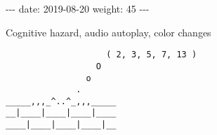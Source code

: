-\/-\/- date: 2019-08-20 weight: 45 -\/-\/-

Cognitive hazard, audio autoplay, color changes

\begin{verbatim}
                    ( 2, 3, 5, 7, 13 )
                  O
                o
              .
_____,,,_^..^_,,,_____
__|____|____|____|____
____|____|____|____|__
\end{verbatim}
